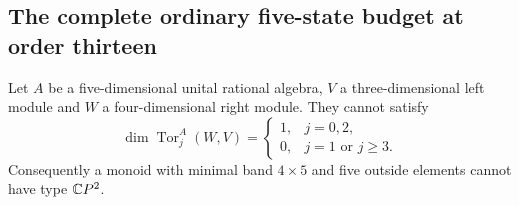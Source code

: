 \subsection{The complete ordinary five-state budget at order thirteen}

\begin{lemma}
\label{CP2:A-five-dimensional-three-four-target}
Let $A$ be a five-dimensional unital rational algebra, $V$ a
three-dimensional left module and $W$ a four-dimensional right
module. They cannot satisfy
\[
 \dim\operatorname{Tor}^A_j(W,V)=
 \begin{cases}1,&j=0,2,\\0,&j=1\text{ or }j\geq3.\end{cases}
\]
Consequently a monoid with minimal band $4\times5$ and five
outside elements cannot have type $\mathbb{C}P^2$.
\end{lemma}
